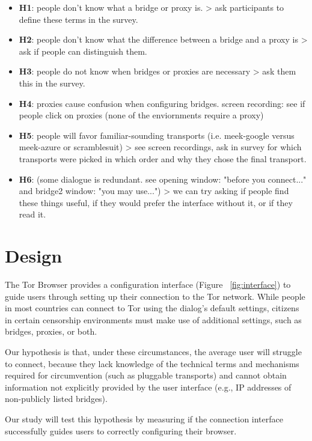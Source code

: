 \documentclass{template}
\begin{document}
\begin{itemize} \itemsep1pt \parskip0pt 
\item  {\bfseries H1}: people don't know what a bridge or proxy is. > ask participants to define these terms in the survey.  
\item  {\bfseries H2}: people don't know what the difference between a bridge and a proxy is > ask if people can distinguish them. 
\item  {\bfseries H3}: people do not know when bridges or proxies are necessary > ask them this in the survey.  
\item  {\bfseries H4}: proxies cause confusion when configuring bridges. screen recording: see if people click on proxies (none of the enviornments require a proxy)
\item  {\bfseries H5}: people will favor familiar-sounding transports (i.e. meek-google versus meek-azure or scramblesuit) > see screen recordings, ask in survey for which transports were picked in which order and why they chose the final transport.  
\item {\bfseries H6}: (some dialogue is redundant. see opening window: "before you connect..." and bridge2 window: "you may use...") > we can try asking if people find these things useful, if they would prefer the interface without it, or if they read it.  
\end{itemize} 

\section{Design}

The Tor Browser provides a configuration interface (Figure
~\ref{fig:interface}) to guide users through setting up their connection to the
Tor network. While people in most countries can connect to Tor using the
dialog's default settings, citizens in certain censorship environments must
make use of additional settings, such as bridges, proxies, or both.

Our hypothesis is that, under these circumstances, the average user will
struggle to connect, because they lack knowledge of the technical terms and
mechanisms required for circumvention (such as pluggable transports) and cannot
obtain information not explicitly provided by the user interface (e.g., IP
addresses of non-publicly listed bridges).

Our study will test this hypothesis by measuring if the connection
interface successfully guides users to correctly configuring their browser.\\
\end{document}
